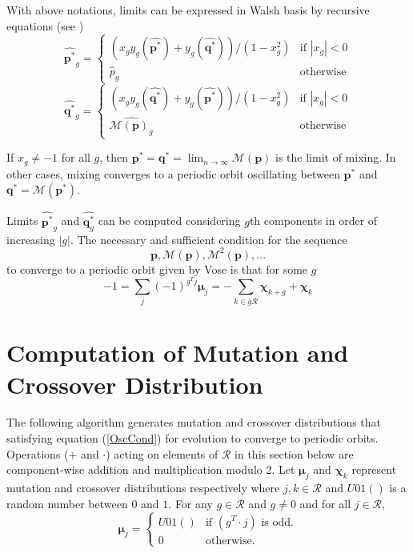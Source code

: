 With above notations, limits can be expressed in Walsh basis by recursive equations (see \cite{Vose1999})
\begin{equation}
\label{lt1}
\widehat{{\bm p}^{\ast}}_g  = \begin{cases}
    (x_g y_g(\widehat{{\bm p}^{\ast}}) + y_g(\widehat{{\bm q}^{\ast}}))/(1-x_g^2)  & \text{if $|x_g| < 0$}\\
    \widehat{p}_g  & \text{otherwise}
  \end{cases}
\end{equation}
\begin{equation}
\label{lt2}
\widehat{{\bm q}^{\ast}}_g  = \begin{cases}
    (x_g y_g(\widehat{{\bm q}^{\ast}}) + y_g(\widehat{{\bm p}^{\ast}}))/(1-x_g^2)  & \text{if $|x_g| < 0$}\\
    \widehat{\mathcal{M}({\bm p})_g}  & \text{otherwise}
  \end{cases}
\end{equation}

If $x_g \neq -1$ for all $g$, then ${\bm p}^\ast = {\bm q}^\ast = \lim_{n \rightarrow \infty} \mathcal{M}({\bm p})$ is the limit of mixing. In other cases, 
mixing converges to a periodic orbit oscillating between ${\bm p}^\ast$ and ${\bm q}^\ast = \mathcal{M}({\bm p}^\ast)$.

Limits $\widehat{{\bm p}^{\ast}}_g$ and $\widehat{{\bm q}^{\ast}_g}$ can be computed considering $g$th components in order of increasing $|g|$.
The necessary and sufficient condition for the sequence
\[
\bm{p}, \mathcal{M}({\bm p}), \mathcal{M}^2({\bm p}),...
\]
to converge to a periodic orbit given by Vose is that for some $g$
\begin{equation}
\label{OscCond}
-1 = \sum \limits_{j} (-1)^{g^T j} \bm{\mu}_j = - \sum \limits_{k \in \bar{g}\mathcal{R}} \bm{\chi}_{k+g} + \bm{\chi}_k
\end{equation}
 
\section{Computation of Mutation and Crossover Distribution}
The following algorithm generates mutation and crossover distributions that satisfying equation (\ref{OscCond}) 
for evolution to converge to periodic orbits. Operations ($+$ and $\cdot$) acting on elements of $\mathcal{R}$ 
in this section below are component-wise addition and multiplication modulo 2. 
Let $\bm{\mu}_j$ and $\bm{\chi}_k$ represent mutation and crossover distributions respectively where $j,k \in \mathcal{R}$ 
and $U01()$ is a random number between $0$ and $1$. For any $g \in \mathcal{R}$ and $g \neq 0$ and for all $j \in \mathcal{R}$,
\[
\bm{\mu}_j = \begin{cases}
    U01() & \text{if $(g^T\cdot j)$ is odd}.\\
    0 & \text{otherwise}.
  \end{cases}
\]

